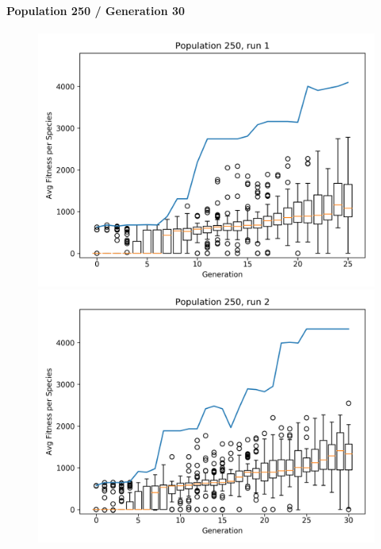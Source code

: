 		\paragraph{Population 250 / Generation 30}
			\label{par:mario250}
			\begin{figure}[h]
				\centering
				\begin{minipage}{0.33\textwidth}
					\centering
					\includegraphics[width=1\textwidth]{graphics/mario/pop250_run1} %
				\end{minipage}\hfill
				\begin{minipage}{0.33\textwidth}
					\centering
					\includegraphics[width=1\textwidth]{graphics/mario/pop250_run2} %

\end{minipage}
\end{figure}
